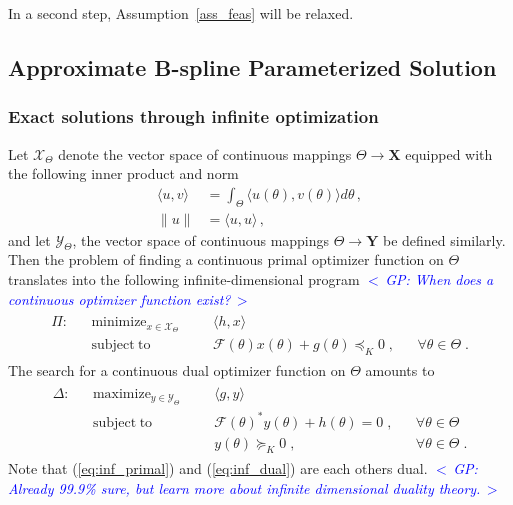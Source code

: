 \documentclass{article}
\newcommand{\ppar}{\theta}                  %
\newcommand{\Ppar}{\Theta}                  %
\newcommand{\Xm}{\bm{\mathcal{X}}_{\Theta}}
\newcommand{\Ym}{\bm{\mathcal{Y}}_{\Theta} }
\newcommand{\X}{\mathbf{X}}
\newcommand{\Y}{\mathbf{Y}}
\newcommand{\calF}{\mathcal{F}}
\DeclareMathOperator*{\minimize}{minimize}
\DeclareMathOperator*{\maximize}{maximize}
\DeclareMathOperator*{\subj}{subject\;to}
\newcommand{\commentGP}[1]{\noindent \textcolor{blue}{\emph{$<\,$GP: #1$\,>$}}}%
\begin{document}
In a second step, Assumption~\ref{ass_feas} will be relaxed.



\subsection{Approximate B-spline Parameterized Solution}\label{subsec:parameterized_solution}%

\subsubsection*{Exact solutions through infinite optimization}%

Let $\Xm$ denote the vector space of continuous mappings $\Ppar \rightarrow \X$ equipped with the following inner product and norm
\begin{align*}
\langle u,v \rangle &= \int_{\Ppar} \langle u(\ppar), v(\ppar) \rangle d\ppar\,,\\%
\| u \|             &= \langle u,u \rangle \,,
\end{align*}
and let $\Ym$, the vector space of continuous mappings $\Ppar \rightarrow \Y$ be defined similarly. Then the problem of finding a continuous primal optimizer function on $\Ppar$ translates into the following infinite-dimensional program \commentGP{When does a continuous optimizer function exist?}
\begin{gather}\label{eq:inf_primal}
\begin{aligned}
\Pi: && \minimize_{x\in\Xm} &&& \langle h, x \rangle\\
     && \subj               &&& \calF(\ppar)x(\ppar) + g(\ppar)\preceq_K 0 \;, && \forall \ppar\in\Ppar\;.%
\end{aligned}
\end{gather}
The search for a continuous dual optimizer function on $\Ppar$ amounts to
\begin{gather}\label{eq:inf_dual}
\begin{aligned}
\Delta: && \maximize_{y\in\Ym} &&& \langle g , y \rangle\\
        && \subj               &&& \calF(\ppar)^* y(\ppar) + h(\ppar)= 0 \;, && \forall \ppar \in\Ppar\\%
        &&                     &&& y(\ppar) \succeq_K 0                  \;, && \forall \ppar \in\Ppar\;.%
\end{aligned}
\end{gather}
Note that (\ref{eq:inf_primal}) and (\ref{eq:inf_dual}) are each others dual. \commentGP{Already 99.9\% sure, but learn more about infinite dimensional duality theory.}
\end{document}
